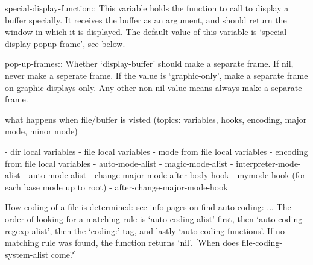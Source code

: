 \documentclass[a4paper]{report}
\begin{document}
special-display-function::
This variable holds the function to call to display a buffer
specially.  It receives the buffer as an argument, and should
return the window in which it is displayed.  The default value of
this variable is `special-display-popup-frame', see below.


pop-up-frames::
Whether `display-buffer' should make a separate frame.
If nil, never make a seperate frame.
If the value is `graphic-only', make a separate frame
on graphic displays only.
Any other non-nil value means always make a separate frame.
  


what happens when file/buffer is visted (topics: variables, hooks, encoding,
major mode, minor mode)

- dir local variables
- file local variables
  - mode from file local variables
  - encoding from file local variables
- auto-mode-alist
- magic-mode-alist
- interpreter-mode-alist
- auto-mode-alist
- change-major-mode-after-body-hook
- mymode-hook (for each base mode up to root)
- after-change-major-mode-hook


How coding of a file is determined: see info pages on find-auto-coding:
... The order of looking for a matching rule is ‘auto-coding-alist’ first,
then ‘auto-coding-regexp-alist’, then the ‘coding:’ tag, and lastly
‘auto-coding-functions’.  If no matching rule was found, the function returns
‘nil’. [When does file-coding-system-alist come?]
\end{document}
